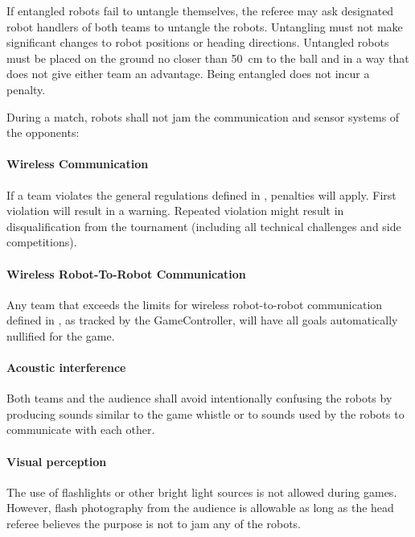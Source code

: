 If entangled robots fail to untangle themselves, the referee may ask designated robot handlers of both teams to untangle the robots. Untangling must not make significant changes to robot positions or heading directions. Untangled robots must be placed on the ground no closer than \qty{50}{\centi\metre} to the ball and in a way that does not give either team an advantage. Being entangled does not incur a penalty.


\label{sec:jamming}

During a match, robots shall not jam the communication and sensor systems of the opponents:

\paragraph{Wireless Communication}
If a team violates the general regulations defined in , penalties will apply. 
First violation will result in a warning.
Repeated violation might result in disqualification from the tournament (including all technical challenges and side competitions). 
	
\paragraph{Wireless Robot-To-Robot Communication} Any team that exceeds the limits for wireless robot-to-robot communication defined in , as tracked by the GameController, will have all goals automatically nullified for the game.
	
\paragraph{Acoustic interference} Both teams and the audience shall avoid intentionally confusing the robots by producing sounds similar to the game whistle or to sounds used by the robots to communicate with each other.
	
\paragraph{Visual perception} The use of flashlights or other bright light sources is not allowed during games. However, flash photography from the audience is allowable as long as the head referee believes the purpose is not to jam any of the robots.

\label{sec:free_kick}

